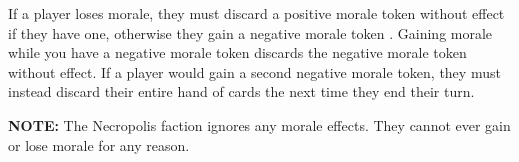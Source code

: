 If a player loses morale, they must discard a positive morale token  without effect if they have one, otherwise they gain a negative morale token .
Gaining morale while you have a negative morale token discards the negative morale token without effect.
If a player would gain a second negative morale token, they must instead discard their entire hand of cards the next time they end their turn.\par
\textbf{NOTE:} The Necropolis  faction ignores any morale effects.
They cannot ever gain or lose morale for any reason.
